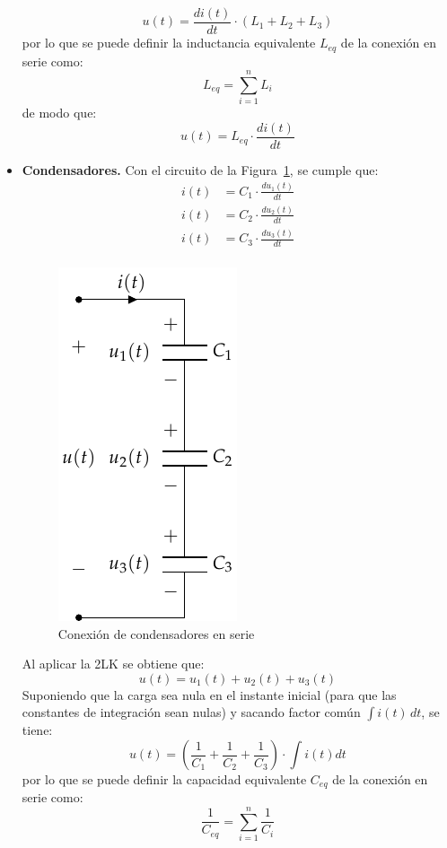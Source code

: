\documentclass[11pt]{book} %
\numberwithin{dummy}{section}
\theoremstyle{ocrenumbox}
\theoremstyle{blacknumex}
\theoremstyle{blacknumbox}
\theoremstyle{ocrenum}
\begin{document}
\begin{itemize}
\begin{equation*}
			u(t) = \dfrac{di(t)}{dt} \cdot (L_1 + L_2 + L_3)
		\end{equation*}
		por lo que se puede definir la inductancia equivalente $L_{eq}$ de la conexión en serie como:
		\begin{equation}
			\boxed{L_{eq} = \sum_{i = 1}^n L_i}
		\end{equation}
		de modo que:
		\begin{equation*}
			u(t) = L_{eq} \cdot \dfrac{di(t)}{dt}
		\end{equation*}
		\item \textbf{Condensadores.} Con el circuito de la Figura~\ref{fig.condensadores-serie}, se cumple que:
		\begin{align*}
			i(t) &= C_1 \cdot \frac{du_1(t)}{dt}\\
			i(t) &= C_2 \cdot \frac{du_2(t)}{dt}\\
			i(t) &= C_3 \cdot \frac{du_3(t)}{dt}\\
		\end{align*}
		\begin{figure}[htbp]
			\centering
			\includegraphics[width=0.2\linewidth]{../figs/CondensadoresSerie.pdf}
			\caption{Conexión de condensadores en serie}
			\label{fig.condensadores-serie}
		\end{figure}
		Al aplicar la 2LK se obtiene que: 
		\begin{equation*}
			u(t) = u_1(t) + u_2(t) + u_3(t)
		\end{equation*}
		Suponiendo que la carga sea nula en el instante inicial (para que las constantes de integración sean nulas) y sacando factor común $\int i(t)\,dt$, se tiene:
		\begin{equation*}
			u(t)=\left(\dfrac{1}{C_1}+\dfrac{1}{C_2}+\dfrac{1}{C_3} \right)\cdot \int i(t) dt
		\end{equation*}
		por lo que se puede definir la capacidad equivalente $C_{eq}$ de la conexión en serie como:
		\begin{equation}
			\boxed{\dfrac{1}{C_{eq}} = \sum_{i = 1}^n \dfrac{1}{C_i}}

\end{equation}
\end{itemize}
\end{document}
